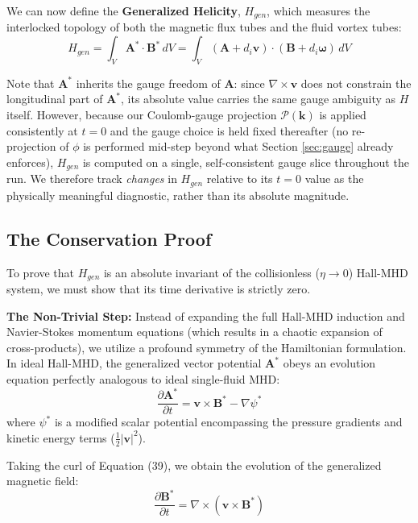 \documentclass[11pt, a4paper]{article}
\begin{document}
We can now define the \textbf{Generalized Helicity}, $H_{gen}$, which measures the interlocked topology of both the magnetic flux tubes and the fluid vortex tubes:
\begin{equation}
    H_{gen} = \int_V \mathbf{A}^* \cdot \mathbf{B}^* \, dV = \int_V (\mathbf{A} + d_i \mathbf{v}) \cdot (\mathbf{B} + d_i \boldsymbol{\omega}) \, dV
\end{equation}

Note that $\mathbf{A}^*$ inherits the gauge freedom of $\mathbf{A}$: since $\nabla \times \mathbf{v}$ does not constrain the longitudinal part of $\mathbf{A}^*$, its absolute value carries the same gauge ambiguity as $H$ itself. However, because our Coulomb-gauge projection $\mathcal{P}(\mathbf{k})$ is applied consistently at $t=0$ and the gauge choice is held fixed thereafter (no re-projection of $\phi$ is performed mid-step beyond what Section \ref{sec:gauge} already enforces), $H_{gen}$ is computed on a single, self-consistent gauge slice throughout the run. We therefore track \textit{changes} in $H_{gen}$ relative to its $t=0$ value as the physically meaningful diagnostic, rather than its absolute magnitude.

\subsection{The Conservation Proof}
To prove that $H_{gen}$ is an absolute invariant of the collisionless ($\eta \to 0$) Hall-MHD system, we must show that its time derivative is strictly zero.

\textbf{The Non-Trivial Step:} Instead of expanding the full Hall-MHD induction and Navier-Stokes momentum equations (which results in a chaotic expansion of cross-products), we utilize a profound symmetry of the Hamiltonian formulation. In ideal Hall-MHD, the generalized vector potential $\mathbf{A}^*$ obeys an evolution equation perfectly analogous to ideal single-fluid MHD:
\begin{equation}
    \frac{\partial \mathbf{A}^*}{\partial t} = \mathbf{v} \times \mathbf{B}^* - \nabla \psi^*
\end{equation}
where $\psi^*$ is a modified scalar potential encompassing the pressure gradients and kinetic energy terms ($\frac{1}{2}|\mathbf{v}|^2$). 

Taking the curl of Equation (39), we obtain the evolution of the generalized magnetic field:
\begin{equation}
    \frac{\partial \mathbf{B}^*}{\partial t} = \nabla \times (\mathbf{v} \times \mathbf{B}^*)
\end{equation}
\end{document}
